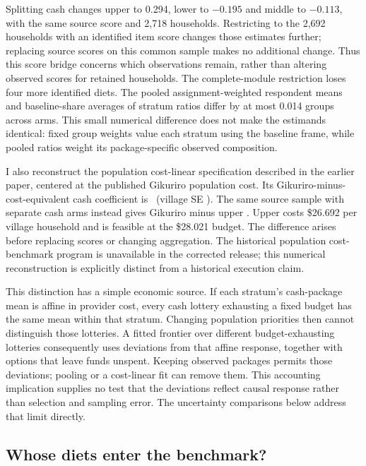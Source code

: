 \documentclass[11pt]{article}
\begin{document}
Splitting cash changes upper to 0.294, lower to $-0.195$ and middle to $-0.113$, with the same source score and 2,718 households. Restricting to the 2,692 households with an identified item score changes those estimates further; replacing source scores on this common sample makes no additional change. Thus this score bridge concerns which observations remain, rather than altering observed scores for retained households. The complete-module restriction loses four more identified diets. The pooled assignment-weighted respondent means and baseline-share averages of stratum ratios differ by at most 0.014 groups across arms. This small numerical difference does not make the estimands identical: fixed group weights value each stratum using the baseline frame, while pooled ratios weight its package-specific observed composition.

I also reconstruct the population cost-linear specification described in the earlier paper, centered at the published Gikuriro population cost. Its Gikuriro-minus-cost-equivalent cash coefficient is \PopulationLinearGKDifference\ (village SE \PopulationLinearGKSE). The same source sample with separate cash arms instead gives Gikuriro minus upper \PopulationSourceGKUpper. Upper costs \$26.692 per village household and is feasible at the \$28.021 budget. The difference arises before replacing scores or changing aggregation. The historical population cost-benchmark program is unavailable in the corrected release; this numerical reconstruction is explicitly distinct from a historical execution claim.

This distinction has a simple economic source. If each stratum's cash-package mean is affine in provider cost, every cash lottery exhausting a fixed budget has the same mean within that stratum. Changing population priorities then cannot distinguish those lotteries. A fitted frontier over different budget-exhausting lotteries consequently uses deviations from that affine response, together with options that leave funds unspent. Keeping observed packages permits those deviations; pooling or a cost-linear fit can remove them. This accounting implication supplies no test that the deviations reflect causal response rather than selection and sampling error. The uncertainty comparisons below address that limit directly.

\subsection{Whose diets enter the benchmark?}
\end{document}
